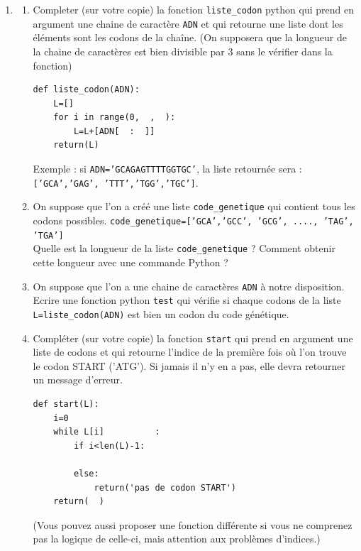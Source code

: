 \begin{exercice}[Informatique]
\begin{enumerate}
\item
\begin{enumerate}
\item Completer (sur votre copie) la fonction \texttt{liste\_codon}  python qui prend en argument une chaine de caractère \texttt{ADN} et qui  retourne une liste dont les éléments sont les codons de la chaîne. (On supposera que la longueur de la chaine de caractères est bien divisible par 3 sans le vérifier dans la fonction) 
\begin{lstlisting}
def liste_codon(ADN):
    L=[]
    for i in range(0,  ,  ):
        L=L+[ADN[  :  ]]
    return(L)
\end{lstlisting}

Exemple : si \texttt{ADN='GCAGAGTTTTGGTGC'}, la liste retournée sera :
\texttt{['GCA','GAG', 'TTT','TGG','TGC']}.\\
 
 \item On suppose que l'on a  créé une liste \texttt{code\_genetique} qui contient tous les codons possibles. \texttt{code\_genetique=['GCA','GCC', 'GCG', ...., 'TAG', 'TGA']}\\
 
Quelle est la longueur de la liste \texttt{code\_genetique} ? Comment obtenir cette longueur avec une commande Python ? \\

\item On suppose que l'on a une chaine de caractères \texttt{ADN} à notre disposition. 
Ecrire une fonction python \texttt{test} qui vérifie si chaque codons de la liste \texttt{L=liste\_codon(ADN)} est bien un codon du code génétique. \\

\item Compléter (sur votre copie) la fonction \texttt{start} qui prend en argument une liste de codons et qui retourne  l'indice de la première fois où l'on trouve le codon START ('ATG'). Si jamais il n'y en a pas, elle devra retourner un message d'erreur. \\ 
\begin{lstlisting}
def start(L):
    i=0
    while L[i]          :
        if i<len(L)-1:
            
        else:
            return('pas de codon START')
    return(  )
\end{lstlisting}

(Vous pouvez aussi proposer une fonction différente si vous ne comprenez pas la logique de celle-ci, mais attention aux problèmes d'indices.) 


\end{enumerate}
\end{enumerate}
\end{exercice}
